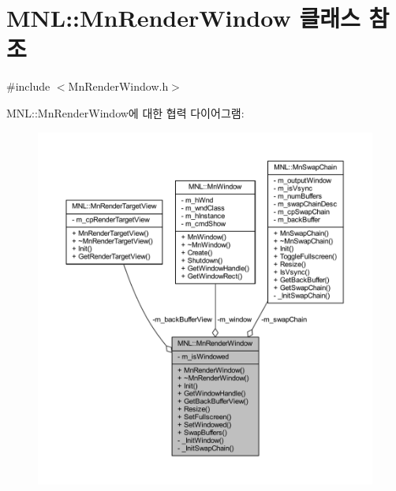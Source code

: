 \hypertarget{class_m_n_l_1_1_mn_render_window}{}\section{M\+NL\+:\+:Mn\+Render\+Window 클래스 참조}
\label{class_m_n_l_1_1_mn_render_window}


{\ttfamily \#include $<$Mn\+Render\+Window.\+h$>$}



M\+NL\+:\+:Mn\+Render\+Window에 대한 협력 다이어그램\+:\nopagebreak
\begin{figure}[H]
\begin{center}
\leavevmode
\includegraphics[width=350pt]{class_m_n_l_1_1_mn_render_window__coll__graph}
\end{center}
\end{figure}
